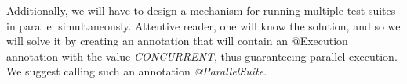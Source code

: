 Additionally, we will have to design a mechanism for running multiple test suites in parallel simultaneously. Attentive reader, one will know the solution, and so we will solve it by creating an annotation that will contain an @Execution annotation with the value \emph{CONCURRENT}, thus guaranteeing parallel execution. We suggest calling such an annotation \emph{@ParallelSuite}.
